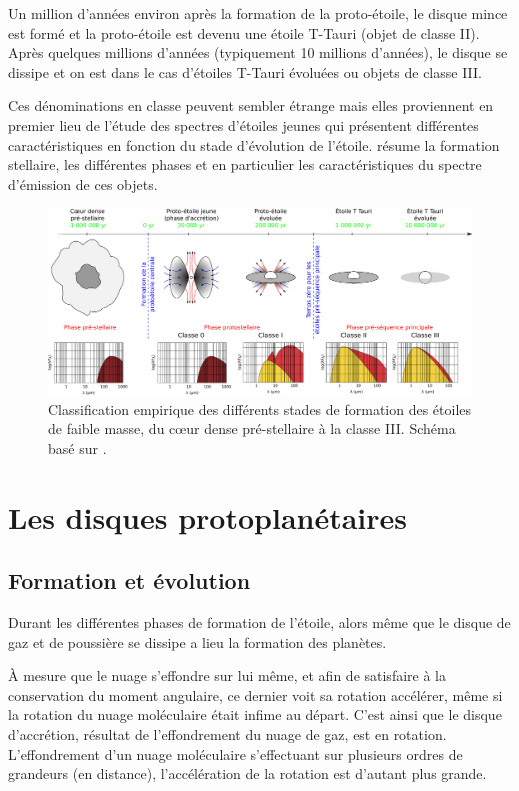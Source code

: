 Un million d'années environ après la formation de la proto-étoile, le disque mince est formé et la proto-étoile est devenu une étoile T-Tauri (objet de classe II). Après quelques millions d'années (typiquement 10 millions d'années), le disque se dissipe et on est dans le cas d'étoiles T-Tauri évoluées ou objets de classe III. 

Ces dénominations en classe peuvent sembler étrange mais elles proviennent en premier lieu de l'étude des spectres d'étoiles jeunes qui présentent différentes caractéristiques en fonction du stade d'évolution de l'étoile.  résume la formation stellaire, les différentes phases et en particulier les caractéristiques du spectre d'émission de ces objets.
 
\begin{figure}[htb]
\centering
\includegraphics[width=\linewidth]{figure/star_formation.pdf}
\caption{Classification empirique des différents stades de formation des étoiles de faible masse, du cœur dense pré-stellaire à la classe III. Schéma basé sur \citep{andre2002initial}. }\label{fig:star_formation}
\end{figure}


\section{Les disques protoplanétaires}


\subsection{Formation et évolution}
Durant les différentes phases de formation de l'étoile, alors même que le disque de gaz et de poussière se dissipe a lieu la formation des planètes. 

À mesure que le nuage s'effondre sur lui même, et afin de satisfaire à la conservation du moment angulaire, ce dernier voit sa rotation accélérer, même si la rotation du nuage moléculaire était infime au départ. C'est ainsi que le disque d'accrétion, résultat de l'effondrement du nuage de gaz, est en rotation. L'effondrement d'un nuage moléculaire s'effectuant sur plusieurs ordres de grandeurs (en distance), l'accélération de la rotation est d'autant plus grande.

